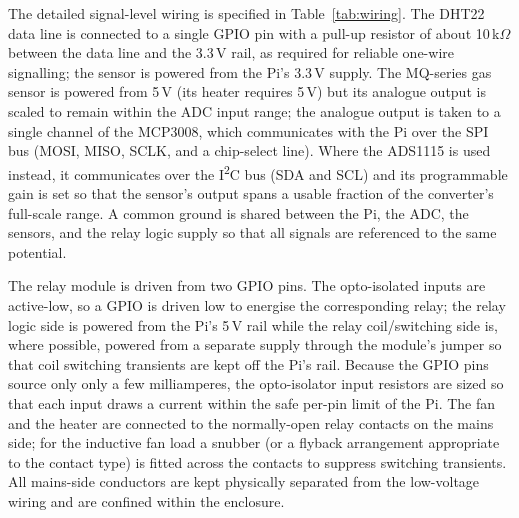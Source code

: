 \documentclass[12pt,a4paper]{report}
\begin{document}
The detailed signal-level wiring is specified in Table~\ref{tab:wiring}. The DHT22 data line is connected to a single GPIO pin with a pull-up resistor of about 10\,k$\Omega$ between the data line and the 3.3\,V rail, as required for reliable one-wire signalling; the sensor is powered from the Pi's 3.3\,V supply. The MQ-series gas sensor is powered from 5\,V (its heater requires 5\,V) but its analogue output is scaled to remain within the ADC input range; the analogue output is taken to a single channel of the MCP3008, which communicates with the Pi over the SPI bus (MOSI, MISO, SCLK, and a chip-select line). Where the ADS1115 is used instead, it communicates over the I\textsuperscript{2}C bus (SDA and SCL) and its programmable gain is set so that the sensor's output spans a usable fraction of the converter's full-scale range. A common ground is shared between the Pi, the ADC, the sensors, and the relay logic supply so that all signals are referenced to the same potential.

The relay module is driven from two GPIO pins. The opto-isolated inputs are active-low, so a GPIO is driven low to energise the corresponding relay; the relay logic side is powered from the Pi's 5\,V rail while the relay coil/switching side is, where possible, powered from a separate supply through the module's jumper so that coil switching transients are kept off the Pi's rail. Because the GPIO pins source only only a few milliamperes, the opto-isolator input resistors are sized so that each input draws a current within the safe per-pin limit of the Pi. The fan and the heater are connected to the normally-open relay contacts on the mains side; for the inductive fan load a snubber (or a flyback arrangement appropriate to the contact type) is fitted across the contacts to suppress switching transients. All mains-side conductors are kept physically separated from the low-voltage wiring and are confined within the enclosure.
\end{document}
